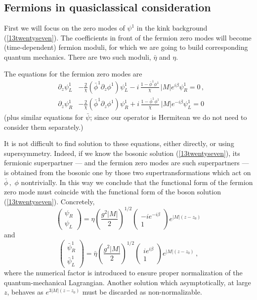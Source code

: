 \documentclass[epsfig,12pt]{article}
\def\beq{\begin{equation}}
\def\eeq{\end{equation}}
\def\beqn{\begin{eqnarray}}
\def\eeqn{\end{eqnarray}}
\def\beqn{\begin{eqnarray}}
\def\eeqn{\end{eqnarray}}
\def\beq{\begin{equation}}
\def\eeq{\end{equation}}
\begin{document}
\subsection{Fermions in quasiclassical consideration}

First we will  focus on the 
zero modes of $\psi^1$ in the kink background (\ref{13twentyseven}).
The coefficients
in front of the fermion zero modes will become (time-dependent)
 fermion moduli, for which we are going to build
corresponding quantum mechanics. 
There are two such moduli, $\bar\eta$ and $\eta$.

The equations for the fermion zero modes are
\beqn
&\partial_z\psi_L^1&    - \frac{2}{\chi}\left(\bar\phi^1\partial_z\phi^1
\right)\psi_L^1 -i\,\frac{1-\bar\phi^1\phi^1}{\chi}\, |M| e^{i\beta}\psi_R^1
=0\,,
\nonumber\\[3mm]
&\partial_z\psi_R^1&   - \frac{2}{\chi}\left(\bar\phi^1\partial_z\phi^1
\right)\psi_R^1 + i\,\frac{1-\bar\phi^1\phi^1}{\chi}\, |M| e^{- i\beta}\psi_L^1=0
\label{13fourtyfour}
\eeqn
(plus   similar equations for $\bar\psi$; since our operator is 
Hermitean we do not need to consider them separately.)

It is not difficult to find solution to these 
equations, either directly, or using supersymmetry.
Indeed, if we know the bosonic solution (\ref{13twentyseven}),
its fermionic superpartner --- and the fermion zero modes are such 
 superpartners --- is obtained from the
bosonic one by those two supertransformations which act on
$\bar\phi\,,\,\,\phi$ nontrivially.
In this way we conclude that the
  functional form of the fermion zero mode 
must coincide  with the functional form of the boson  
  solution (\ref{13twentyseven}). Concretely,
\beq
\left(\begin{array}{c}
\psi_R\\  \psi_L
\end{array}
\right)=\eta 
\left(\frac{g^2|M|}{2}\right)^{1/2}
\left(\begin{array}{c}
-ie^{-i\beta}\\   1
\end{array}
\right)e^{|M|(z-z_0)}
\label{13fourtyfive}
\eeq
 and
 \beq
\left(\begin{array}{c}
\bar \psi_R^1\\  \bar \psi_L^1
\end{array}
\right)=\bar\eta \left(\frac{g^2|M|}{2}\right)^{1/2} \left(\begin{array}{c}
ie^{ i\beta}\\   1
\end{array}
\right)e^{|M|(z-z_0)}\,,
\label{13fourtysix}
\eeq
where the numerical factor is introduced to ensure proper
normalization of the quantum-mechanical Lagrangian.
Another solution which asymptotically, at large $z$, behaves
as $e^{3|M|(z-z_0)}$ must be discarded as non-normalizable.
\end{document}
